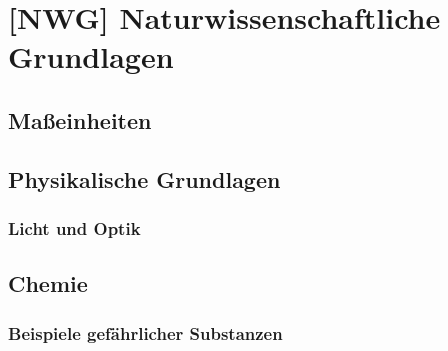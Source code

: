 \chapter{[NWG] Naturwissenschaftliche Grundlagen}

\section{Maßeinheiten}
\section{Physikalische Grundlagen}
\subsection{Licht und Optik}
\section{Chemie}


\subsection{Beispiele gefährlicher Substanzen}